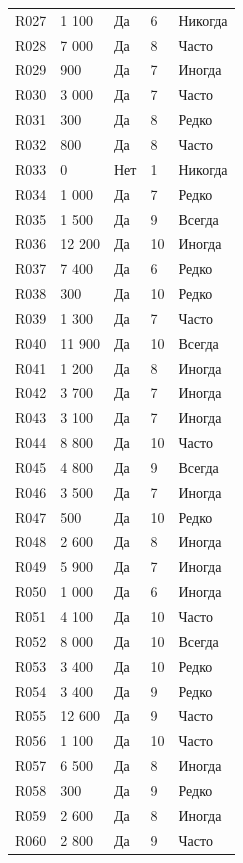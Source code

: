 {\begin{longtable}{L{1.05cm}R{2.2cm}C{2.65cm}C{2.3cm}L{4.0cm}}
R027 & 1 100 & Да & 6 & Никогда \\
R028 & 7 000 & Да & 8 & Часто \\
R029 & 900 & Да & 7 & Иногда \\
R030 & 3 000 & Да & 7 & Часто \\
R031 & 300 & Да & 8 & Редко \\
R032 & 800 & Да & 8 & Часто \\
R033 & 0 & Нет & 1 & Никогда \\
R034 & 1 000 & Да & 7 & Редко \\
R035 & 1 500 & Да & 9 & Всегда \\
R036 & 12 200 & Да & 10 & Иногда \\
R037 & 7 400 & Да & 6 & Редко \\
R038 & 300 & Да & 10 & Редко \\
R039 & 1 300 & Да & 7 & Часто \\
R040 & 11 900 & Да & 10 & Всегда \\
R041 & 1 200 & Да & 8 & Иногда \\
R042 & 3 700 & Да & 7 & Иногда \\
R043 & 3 100 & Да & 7 & Иногда \\
R044 & 8 800 & Да & 10 & Часто \\
R045 & 4 800 & Да & 9 & Всегда \\
R046 & 3 500 & Да & 7 & Иногда \\
R047 & 500 & Да & 10 & Редко \\
R048 & 2 600 & Да & 8 & Иногда \\
R049 & 5 900 & Да & 7 & Иногда \\
R050 & 1 000 & Да & 6 & Иногда \\
R051 & 4 100 & Да & 10 & Часто \\
R052 & 8 000 & Да & 10 & Всегда \\
R053 & 3 400 & Да & 10 & Редко \\
R054 & 3 400 & Да & 9 & Редко \\
R055 & 12 600 & Да & 9 & Часто \\
R056 & 1 100 & Да & 10 & Часто \\
R057 & 6 500 & Да & 8 & Иногда \\
R058 & 300 & Да & 9 & Редко \\
R059 & 2 600 & Да & 8 & Иногда \\
R060 & 2 800 & Да & 9 & Часто \\
\end{longtable}
}